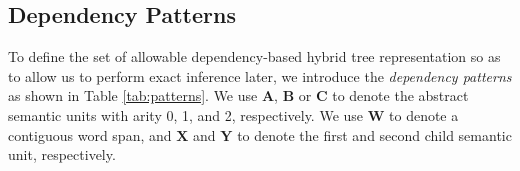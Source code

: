 

\subsection{Dependency  Patterns}\label{sec:patterns}

To define the set of allowable dependency-based hybrid tree representation so as to allow us to perform exact inference later,
we introduce the {\em dependency  patterns} as shown in Table \ref{tab:patterns}.
We use $\mathbf{A}$, $\mathbf{B}$ or $\mathbf{C}$ to denote the abstract semantic units with arity 0, 1, and 2, respectively. We use $\mathbf{W}$ to denote a contiguous word span, and $\mathbf{X}$ and $\mathbf{Y}$ to denote the first and second child semantic unit, respectively.

